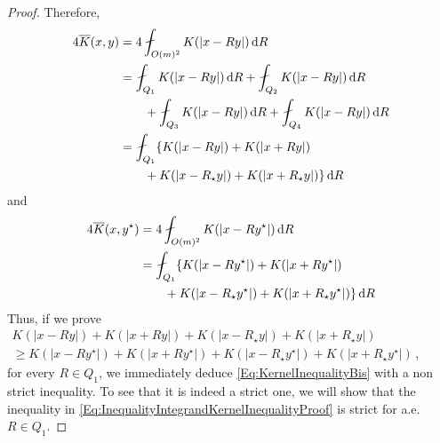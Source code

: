 \begin{proof}
Therefore,
\begin{align*}
4\overline{K} (x, y) &= 4\average_{O(m)^2} K(|x - R y|)\d R \\
& = \average_{Q_1} K(|x - R y|)\d R + \average_{Q_2} K(|x - R y|)\d R \\
& \quad \quad
+ \average_{Q_3} K(|x - R y|)\d R +
\average_{Q_4} K(|x - R y|)\d R \\
&= \average_{Q_1} \{K(|x - R y|) + K(|x + R y|) \\
&\quad \quad + K(|x - R_\star y|) + K(|x + R_\star y|)\}\d R
\end{align*}
and
\begin{align*}
4\overline{K} (x, y^\star) &= 4\average_{O(m)^2} K(|x - R y^\star|)\d R \\
& = \average_{Q_1} \{K(|x - R y^\star|) + K(|x + R y^\star|) \\
&\quad \quad + K(|x - R_\star y^\star|) + K(|x + R_\star y^\star|)\}\d R
\end{align*}
Thus, if we prove
\begin{equation}
\label{Eq:InequalityIntegrandKernelInequalityProof}
\begin{split}
K(|x - R y|) + K(|x + R y|) + K(|x - R_\star y|) + K(|x + R_\star y|)
\quad \quad \quad \quad \quad \quad \quad \quad
\\
\geq
K(|x - R y^\star|) + K(|x + R y^\star|)+K(|x - R_\star y^\star|) + K(|x + R_\star y^\star|)\,,
\end{split}
\end{equation}
for every $R\in Q_1$, we immediately deduce \eqref{Eq:KernelInequalityBis} with a non strict inequality. To see that it is indeed a strict one, we will show that the inequality in \eqref{Eq:InequalityIntegrandKernelInequalityProof} is strict for a.e. $R \in Q_1$.



\end{proof}
